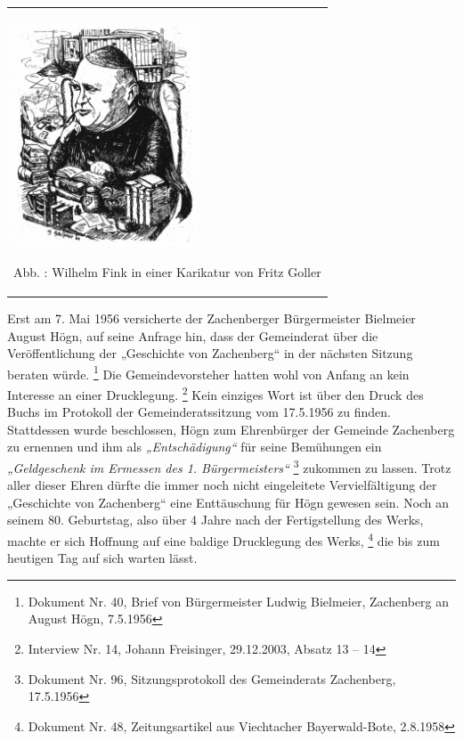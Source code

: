\documentclass[a4paper]{article}
\newcommand\textstyleZitate[1]{\textit{#1}}
\newcommand\textstyleFootnoteSymbol[1]{\textsuperscript{#1}}
\newcounter{Abb}
\renewcommand\theAbb{\arabic{Abb}}
\begin{document}
\begin{center}
\begin{minipage}{5.812cm}
\begin{center}
\tablefirsthead{}
\tablehead{}
\tabletail{}
\tablelasttail{}
\begin{supertabular}{m{5.612cm}}

\includegraphics[width=5.429cm,height=6.68cm]{pictures/zulassungsarbeit-img044.png}

Abb. \stepcounter{Abb}{\theAbb}: Wilhelm Fink in einer Karikatur von
Fritz Goller\\
\end{supertabular}
\end{center}
\end{minipage}
\end{center}
Erst am 7. Mai 1956 versicherte der Zachenberger Bürgermeister Bielmeier
August Högn, auf seine Anfrage hin, dass der Gemeinderat über die
Veröffentlichung der „Geschichte von Zachenberg“ in der nächsten
Sitzung beraten würde. \footnote{Dokument Nr. 40, Brief von
Bürgermeister Ludwig Bielmeier, Zachenberg an August Högn, 7.5.1956}
Die Gemeindevorsteher hatten wohl von Anfang an kein Interesse an einer
Drucklegung. \footnote{Interview Nr. 14, Johann Freisinger, 29.12.2003,
Absatz 13 – 14} Kein einziges Wort ist über den Druck des Buchs im
Protokoll der Gemeinderatssitzung vom 17.5.1956 zu finden. Stattdessen
wurde beschlossen, Högn zum Ehrenbürger der Gemeinde Zachenberg zu
ernennen und ihm als \textstyleZitate{„Entschädigung“ }für seine
Bemühungen ein \textstyleZitate{„Geldgeschenk im Ermessen des 1.
Bürgermeisters“}\textstyleFootnoteSymbol{ } \footnote{Dokument Nr. 96,
Sitzungsprotokoll des Gemeinderats Zachenberg, 17.5.1956} zukommen zu
lassen. Trotz aller dieser Ehren dürfte die immer noch nicht
eingeleitete Vervielfältigung der „Geschichte von Zachenberg“ eine
Enttäuschung für Högn gewesen sein. Noch an seinem 80. Geburtstag, also
über 4 Jahre nach der Fertigstellung des Werks, machte er sich Hoffnung
auf eine baldige Drucklegung des Werks, \footnote{Dokument Nr. 48,
Zeitungsartikel aus Viechtacher Bayerwald-Bote, 2.8.1958} die bis zum
heutigen Tag auf sich warten lässt.
\end{document}
